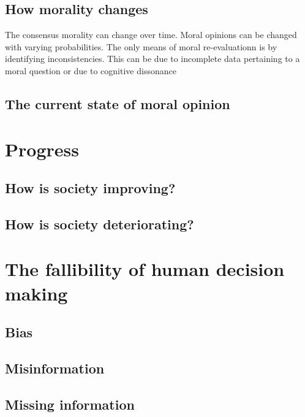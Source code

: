 \subsection{How morality changes}
The consensus morality can change over time.
Moral opinions can be changed with varying probabilities.
The only means of moral re-evaluationn is by identifying inconsistencies.
This can be due to incomplete data pertaining to a moral question or due to cognitive dissonance

\subsection{The current state of moral opinion}

\section{Progress}

\subsection{How is society improving?}

\subsection{How is society deteriorating?}

\section{The fallibility of human decision making}
\subsection{Bias}
\subsection{Misinformation}
\subsection{Missing information}

